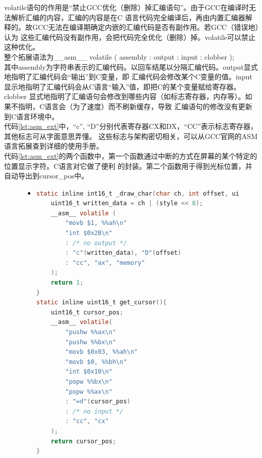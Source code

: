 \documentclass[a4paper]{article}
\begin{document}
    volatile语句的作用是``禁止GCC优化（删除）掉汇编语句''。由于GCC在编译时无法解析汇编的内容，汇编的内容是在C
    语言代码完全编译后，再由内置汇编器解释的。故GCC无法在编译期确定内嵌的汇编代码是否有副作用。若GCC（错误地）认为
    这些汇编代码没有副作用，会把代码完全优化（删除）掉。volatile可以禁止这种优化。\\
    
    整个拓展语法为\_\_asm\_\_ volatile ( assembly : output : input : clobber );\\
    
    其中assembly为字符串表示的汇编代码。以回车结尾以分隔汇编代码。output显式地指明了汇编代码会``输出''到C变量，即
    汇编代码会修改某个C变量的值。input显示地指明了汇编代码会从C语言``输入''值，即把C的某个变量赋给寄存器。clobber
    显式地指明了汇编语句会修改到哪些内容（如标志寄存器，内存等）。如果不指明，C语言会（为了速度）而不刷新缓存，导致
    汇编语句的修改没有更新到C语言环境中。\\
    
    代码\ref{lst:asm_ext}中，``c'', ``D''分别代表寄存器CX和DX，``CC''表示标志寄存器，其他标志可从字面意思弄懂。
    这些标志与架构密切相关，可以从GCC官网的ASM语言拓展查到详细的使用手册。\\
    
    代码\ref{lst:asm_ext}的两个函数中，第一个函数通过中断的方式在屏幕的某个特定的位置显示字符。C语言对它做了便利
    的封装。第二个函数用于得到光标位置，并自动导出到cursor\_pos中。
    \begin{figure}[!htb]
    \begin{itemize}
    \item[] \begin{lstlisting}[language=C, label=lst:asm_ext, caption=GCC内嵌汇编拓展语法详解]
static inline int16_t _draw_char(char ch, int offset, uint8_t style) {
    uint16_t written_data = ch | (style << 8);
    __asm__ volatile (
        "movb $1, %%ah\n"
        "int $0x2B\n"
        : /* no output */
        : "c"(written_data), "D"(offset)
        : "cc", "ax", "memory"
    );
    return 1;
}
static inline uint16_t get_cursor(){
    uint16_t cursor_pos;
    __asm__ volatile(
        "pushw %%ax\n"
        "pushw %%bx\n"
        "movb $0x03, %%ah\n"
        "movb $0, %%bh\n"
        "int $0x10\n"
        "popw %%bx\n"
        "popw %%ax\n"
        : "=d"(cursor_pos)
        : /* no input */
        : "cc", "cx"
    );
    return cursor_pos;
}
    \end{lstlisting}
    \end{itemize}
    \end{figure}
\end{document}
